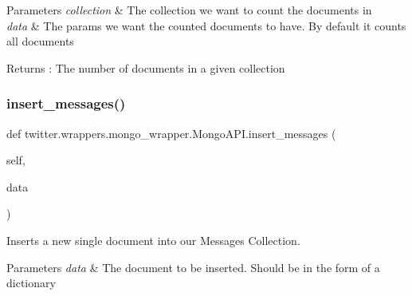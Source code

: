 \begin{DoxyParams}{Parameters}
{\em collection} & The collection we want to count the documents in \\
\hline
{\em data} & The params we want the counted documents to have. By default it counts all documents \\
\hline
\end{DoxyParams}
\begin{DoxyReturn}{Returns}
\+: The number of documents in a given collection 
\end{DoxyReturn}
\mbox{\label{classtwitter_1_1wrappers_1_1mongo__wrapper_1_1MongoAPI_af601222e36a6c0b6e131f788388ef992}} 
\subsubsection{\texorpdfstring{insert\+\_\+messages()}{insert\_messages()}}
{\footnotesize\ttfamily def twitter.\+wrappers.\+mongo\+\_\+wrapper.\+Mongo\+A\+P\+I.\+insert\+\_\+messages (\begin{DoxyParamCaption}\item[{}]{self,  }\item[{}]{data }\end{DoxyParamCaption})}



Inserts a new single document into our Messages Collection. 


\begin{DoxyParams}{Parameters}
{\em data} & The document to be inserted. Should be in the form of a dictionary \\
\hline
\end{DoxyParams}
\mbox{\label{classtwitter_1_1wrappers_1_1mongo__wrapper_1_1MongoAPI_a83f45c0a62f892db52f103756a523716}} 
